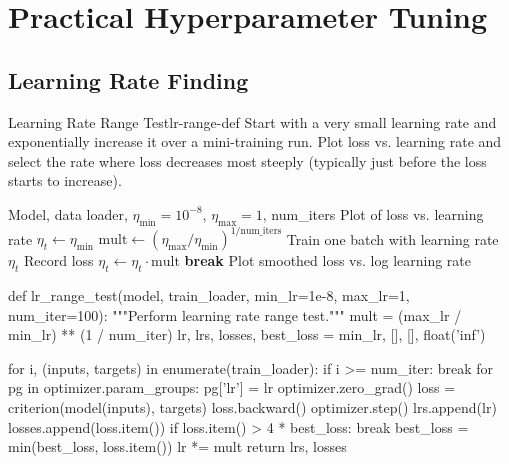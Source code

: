 \documentclass[../../main.tex]{subfiles}
\begin{document}
\section{Practical Hyperparameter Tuning}
\label{sec:hyperparameter-tuning}

\subsection{Learning Rate Finding}

\begin{definition}{Learning Rate Range Test}{lr-range-def}
Start with a very small learning rate and exponentially increase it over a mini-training run. Plot loss vs. learning rate and select the rate where loss decreases most steeply (typically just before the loss starts to increase).
\end{definition}

\begin{algorithm}[htbp]
\caption{Learning Rate Range Test}
\label{alg:lr-range}
\begin{algorithmic}[1]
\Require Model, data loader, $\eta_{\min} = 10^{-8}$, $\eta_{\max} = 1$, num\_iters
\Ensure Plot of loss vs. learning rate
\State $\eta_t \gets \eta_{\min}$
\State $\text{mult} \gets (\eta_{\max}/\eta_{\min})^{1/\text{num\_iters}}$
    \State Train one batch with learning rate $\eta_t$
    \State Record loss
    \State $\eta_t \gets \eta_t \cdot \text{mult}$
        \State \textbf{break}
    \EndIf
\EndFor
\State Plot smoothed loss vs. log learning rate
\end{algorithmic}
\end{algorithm}

\begin{pythoncode}
def lr_range_test(model, train_loader, min_lr=1e-8, max_lr=1, num_iter=100):
    """Perform learning rate range test."""
    mult = (max_lr / min_lr) ** (1 / num_iter)
    lr, lrs, losses, best_loss = min_lr, [], [], float('inf')

    for i, (inputs, targets) in enumerate(train_loader):
        if i >= num_iter:
            break
        for pg in optimizer.param_groups:
            pg['lr'] = lr
        optimizer.zero_grad()
        loss = criterion(model(inputs), targets)
        loss.backward()
        optimizer.step()
        lrs.append(lr)
        losses.append(loss.item())
        if loss.item() > 4 * best_loss:
            break
        best_loss = min(best_loss, loss.item())
        lr *= mult
    return lrs, losses
\end{pythoncode}
\end{document}
